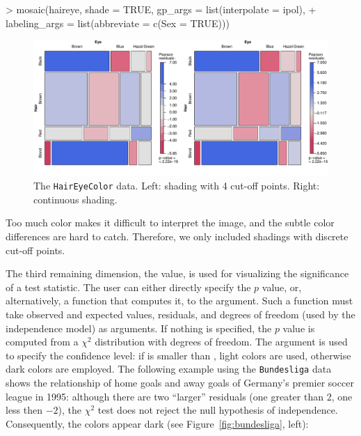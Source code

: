 \documentclass{Z}
\newcommand{\data}[1]{\texttt{#1}}
\begin{document}
\begin{Schunk}
\begin{Sinput}
> mosaic(haireye, shade = TRUE, gp_args = list(interpolate = ipol), 
+     labeling_args = list(abbreviate = c(Sex = TRUE)))
\end{Sinput}
\end{Schunk}

\begin{figure}[htbp]
\begin{center}
\includegraphics{strucplot-interpolatefig}
\caption{\label{fig:interpolatecontinuous}The \data{HairEyeColor}
  data. Left: shading with 4 cut-off points. Right: continuous shading.}

\end{center}
\end{figure} 

\noindent Too much color makes it difficult to interpret the image, and the subtle color
differences are hard to catch. Therefore, we only included shadings
with discrete cut-off points.

The third remaining dimension, the value, is used for
visualizing the significance of a test statistic. The user can either
directly specify the $p$ value, or, alternatively, a function that
computes it, to the  argument. Such a function must take
observed and expected values, residuals, and degrees of freedom (used
by the independence model) as arguments. 
If nothing is specified, the $p$ value is computed from 
a $\chi^2$ distribution with  degrees of
freedom. The  argument is used to specify the confidence
level:  if  is smaller than , light colors are used, 
otherwise dark colors are employed. 
The following example using the \data{Bundesliga} data 
shows the relationship of home goals and away
goals of Germany's premier soccer league in 1995: although there are two
``larger'' residuals (one greater than 2, one less then $-2$), the
$\chi^2$ test does not reject the null hypothesis of
independence. Consequently, the colors appear dark (see
Figure~\ref{fig:bundesliga}, left):
\end{document}
